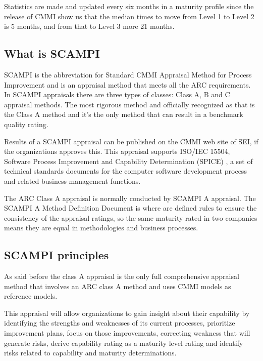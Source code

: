 Statistics are made and updated every six months in a maturity profile since the release of CMMI show us that the median times to move from Level 1 to Level 2 is 5 months, and from that to Level 3 more 21 months.

\subsection{What is SCAMPI}
SCAMPI is the abbreviation for Standard CMMI Appraisal Method for Process Improvement and is an appraisal method that meets all the ARC requirements.
In SCAMPI appraisals there are three types of classes: Class A, B and C appraisal methods. The most rigorous method and officially recognized as that is the Class A method and it's the only method that can result in a benchmark quality rating. 

Results of a SCAMPI appraisal can be published on the CMMI web site of SEI, if the organizations approves this. This appraisal supports ISO/IEC 15504, Software Process Improvement and Capability Determination (SPICE) \citep{dorling1993spice}, a set of technical standards documents for the computer software development process and related business management functions.

The ARC Class A appraisal is normally conducted by SCAMPI A appraisal. The SCAMPI A Method Definition Document is where are defined rules to ensure the consistency of the appraisal ratings, so the same maturity rated in two companies means they are equal in methodologies and business processes.


\subsection{SCAMPI principles}
As said before the class A appraisal is the only full comprehensive appraisal method that involves an ARC class A method and uses CMMI models as reference models.

This appraisal will allow organizations to gain insight about their capability by identifying the strengths and weaknesses of its current processes, prioritize improvement plans, focus on those improvements, correcting weakness that will generate risks, derive capability rating as a maturity level rating and identify risks related to capability and maturity determinations.

